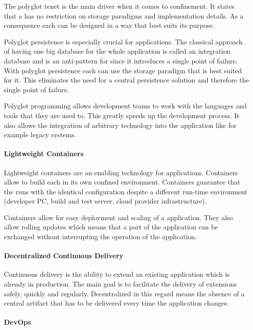 The polyglot tenet is the main driver when it comes to \ms{} confinement. It
states that a \ms{} has no restriction on storage paradigms and implementation
details. As a consequence each \ms{} can be designed in a way that best suits
its purpose.

Polyglot persistence is especially crucial for \ms{} applications. The classical
approach of having one big database for the whole application is called an
integration database and is an anti-pattern for \mss{} since it introduces a
single point of failure. With polyglot persistence each \ms{} can use the
storage paradigm that is best suited for it. This eliminates the need for a
central persistence solution and therefore the single point of failure.

Polyglot programming allows development teams to work with the languages and
tools that they are used to. This greatly speeds up the development process. It
also allows the integration of arbitrary technology into the application like
for example legacy systems.

\paragraph{Lightweight Containers}

Lightweight containers are an enabling technology for \ms{} applications.
Containers allow to build each \ms{} in its own confined environment. Containers
guarantee that the \ms{} runs with the identical configuration despite a
different run-time environment (developer PC, build and test server, cloud
provider infrastructure).

Containers allow for easy deployment and scaling of a \ms{} application. They
also allow rolling updates which means that a part of the application can be
exchanged without interrupting the operation of the application.

\paragraph{Decentralized Continuous Delivery}

Continuous delivery is the ability to extend an existing \ms{} application which
is already in production. The main goal is to facilitate the delivery of
extensions safely, quickly and regularly. Decentralized in this regard means the
absence of a central artifact that has to be delivered every time the
application changes.

\paragraph{DevOps}


